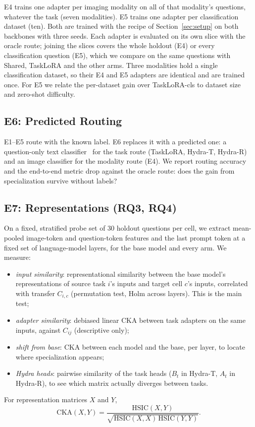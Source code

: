 \documentclass[journal,twoside,web]{ieeecolor}
\begin{document}
E4 trains one adapter per imaging modality on all of that modality's
questions, whatever the task (seven modalities). E5 trains one adapter per
classification dataset (ten). Both are trained with the recipe of
Section~\ref{sec:setup} on both backbones with three seeds. Each adapter is
evaluated on its own slice with the oracle route; joining the slices covers
the whole holdout (E4) or every classification question (E5), which we
compare on the same questions with Shared, TaskLoRA and the other arms.
Three modalities hold a single classification dataset, so
their E4 and E5 adapters are identical and are trained once. For E5 we
relate the per-dataset gain over TaskLoRA-cls to dataset size and zero-shot
difficulty.

\subsection{E6: Predicted Routing}
\label{sec:e6}

E1--E5 route with the known label. E6 replaces it with a predicted one: a
question-only text classifier~\cite{stepanov2025gliclass} for the task route
(TaskLoRA, Hydra-T, Hydra-R) and an image classifier for the modality route
(E4). We report routing accuracy and the end-to-end metric drop against the
oracle route: does the gain from specialization survive without labels?

\subsection{E7: Representations (RQ3, RQ4)}
\label{sec:e7}

On a fixed, stratified probe set of 30 holdout questions per cell, we
extract mean-pooled image-token and question-token features and the last
prompt token at a fixed set of language-model layers, for the base model and
every arm. We measure:
\begin{itemize}
    \item \emph{input similarity}: representational similarity between the
    base model's representations of source task $i$'s inputs and target cell
    $c$'s inputs, correlated with transfer $C_{i,c}$ (permutation test, Holm
    across layers). This is the main test;
    \item \emph{adapter similarity}: debiased linear CKA between task
    adapters on the same inputs, against $C_{ij}$ (descriptive only);
    \item \emph{shift from base}: CKA between each model and the base, per
    layer, to locate where specialization appears;
    \item \emph{Hydra heads}: pairwise similarity of the task heads ($B_t$
    in Hydra-T, $A_t$ in Hydra-R), to see which matrix actually diverges
    between tasks.
\end{itemize}
For representation matrices $X$ and $Y$,
\begin{equation}
\mathrm{CKA}(X,Y)=\frac{\mathrm{HSIC}(X,Y)}
{\sqrt{\mathrm{HSIC}(X,X)\,\mathrm{HSIC}(Y,Y)}}.
\end{equation}
\end{document}
